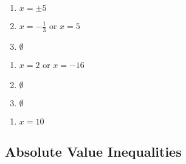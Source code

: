 \begin{multicols}{3}
\begin{enumerate}
	\item $x = \pm 5$
	\item $x = -\frac{1}{3} \text{ or } x = 5$
	\item $\emptyset$
\end{enumerate}	\setcounter{Review}{\value{enumi}}
\end{multicols}
\begin{multicols}{3}
\begin{enumerate}	\setcounter{enumi}{\value{Review}}
	\item $x = 2$ or $x = -16$
	\item $\emptyset$
	\item $\emptyset$
\end{enumerate}	\setcounter{Review}{\value{enumi}}
\end{multicols}
\begin{multicols}{3}
\begin{enumerate}	\setcounter{enumi}{\value{Review}}
	\item $x = 10$
\end{enumerate}	\setcounter{Review}{\value{enumi}}
\end{multicols}



\subsection*{Absolute Value Inequalities}

